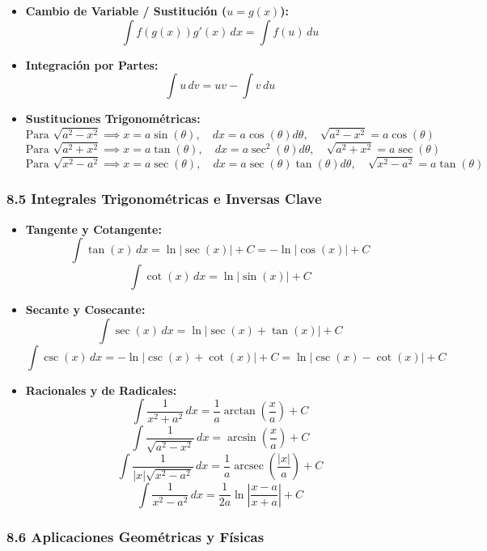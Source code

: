 \documentclass[11pt,a4paper]{article}
\begin{document}
\begin{itemize}
  \item \textbf{Cambio de Variable / Sustitución ($u = g(x)$):}
  \[
    \int f(g(x))g'(x) \, dx = \int f(u) \, du
  \]
  \item \textbf{Integración por Partes:}
  \[
    \int u \, dv = u v - \int v \, du
  \]
  \item \textbf{Sustituciones Trigonométricas:}
  \[
    \text{Para } \sqrt{a^2 - x^2} \implies x = a\sin(\theta), \quad dx = a\cos(\theta) d\theta, \quad \sqrt{a^2 - x^2} = a\cos(\theta)
  \]
  \[
    \text{Para } \sqrt{a^2 + x^2} \implies x = a\tan(\theta), \quad dx = a\sec^2(\theta) d\theta, \quad \sqrt{a^2 + x^2} = a\sec(\theta)
  \]
  \[
    \text{Para } \sqrt{x^2 - a^2} \implies x = a\sec(\theta), \quad dx = a\sec(\theta)\tan(\theta) d\theta, \quad \sqrt{x^2 - a^2} = a\tan(\theta)
  \]
\end{itemize}

\subsubsection*{8.5 Integrales Trigonométricas e Inversas Clave}

\begin{itemize}
  \item \textbf{Tangente y Cotangente:}
  \[
    \int \tan(x) \, dx = \ln|\sec(x)| + C = -\ln|\cos(x)| + C
  \]
  \[
    \int \cot(x) \, dx = \ln|\sin(x)| + C
  \]
  \item \textbf{Secante y Cosecante:}
  \[
    \int \sec(x) \, dx = \ln|\sec(x) + \tan(x)| + C
  \]
  \[
    \int \csc(x) \, dx = -\ln|\csc(x) + \cot(x)| + C = \ln|\csc(x) - \cot(x)| + C
  \]
  \item \textbf{Racionales y de Radicales:}
  \[
    \int \frac{1}{x^2 + a^2} \, dx = \frac{1}{a} \arctan\left(\frac{x}{a}\right) + C
  \]
  \[
    \int \frac{1}{\sqrt{a^2 - x^2}} \, dx = \arcsin\left(\frac{x}{a}\right) + C
  \]
  \[
    \int \frac{1}{|x|\sqrt{x^2 - a^2}} \, dx = \frac{1}{a} \operatorname{arcsec}\left(\frac{|x|}{a}\right) + C
  \]
  \[
    \int \frac{1}{x^2 - a^2} \, dx = \frac{1}{2a} \ln\left|\frac{x - a}{x + a}\right| + C
  \]
\end{itemize}

\subsubsection*{8.6 Aplicaciones Geométricas y Físicas}
\end{document}
